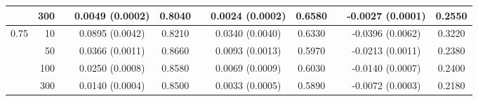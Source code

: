 \documentclass[12pt]{article}
\begin{document}
\begin{table}[h]
{\begin{tabular}{crccccccccc}
  &   300 && 0.0049 (0.0002) & 0.8040 && 0.0024 (0.0002) & 0.6580 && -0.0027 (0.0001) & 0.2550 \\ 
\hline
\multirow{4}{*}{0.75}   
  &    10 && 0.0895 (0.0042) & 0.8210 && 0.0340 (0.0040) & 0.6330 && -0.0396 (0.0062) & 0.3220 \\ 
  &    50 && 0.0366 (0.0011) & 0.8660 && 0.0093 (0.0013) & 0.5970 && -0.0213 (0.0011) & 0.2380 \\ 
  &   100 && 0.0250 (0.0008) & 0.8580 && 0.0069 (0.0009) & 0.6030 && -0.0140 (0.0007) & 0.2400 \\ 
  &   300 && 0.0140 (0.0004) & 0.8500 && 0.0033 (0.0005) & 0.5890 && -0.0072 (0.0003) & 0.2180 \\   \hline
\end{tabular}}
\end{table}
\end{document}

